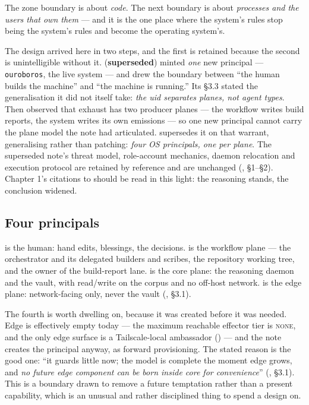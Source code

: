 The zone boundary is about \emph{code}. The next boundary is about \emph{processes
and the users that own them} --- and it is the one place where the system's rules
stop being the system's rules and become the operating system's.

\begin{devolution}
The design arrived here in two steps, and the first is retained because the second
is unintelligible without it. 
(\textbf{superseded}) minted \emph{one} new principal --- \texttt{ouroboros}, the
live system --- and drew the boundary between ``the human builds the machine'' and
``the machine is running.'' Its \S 3.3 stated the generalisation it did not itself
take: \emph{the uid separates planes, not agent types}. Then 
observed that exhaust has two producer planes --- the workflow writes build
reports, the system writes its own emissions --- so one new principal cannot carry
the plane model the note had articulated. 
supersedes it on that warrant, generalising rather than patching: \emph{four OS
principals, one per plane}. The superseded note's threat model, role-account
mechanics, daemon relocation and execution protocol are retained by reference and
are unchanged (, \S 1--\S 2). Chapter 1's citations
to  should be read in this light: the reasoning
stands, the conclusion widened.
\end{devolution}

\subsection*{Four principals}

\phuman{} is the human: hand edits, blessings, the decisions. \pwork{} is the
workflow plane --- the orchestrator and its delegated builders and scribes, the
repository working tree, and the owner of the build-report lane. \pcore{} is the
core plane: the reasoning daemon and the vault, with read/write on the corpus and
no off-host network. \pedge{} is the edge plane: network-facing only, never the
vault (, \S 3.1).

The fourth is worth dwelling on, because it was created before it was needed. Edge
is effectively empty today --- the maximum reachable effector tier is
\textsc{none}, and the only edge surface is a Tailscale-local ambassador
() --- and the note creates the principal anyway, as
forward provisioning. The stated reason is the good one: ``it guards little now;
the model is complete the moment edge grows, and \emph{no future edge component can
be born inside core for convenience}'' (, \S 3.1).
This is a boundary drawn to remove a future temptation rather than a present
capability, which is an unusual and rather disciplined thing to spend a design on.

